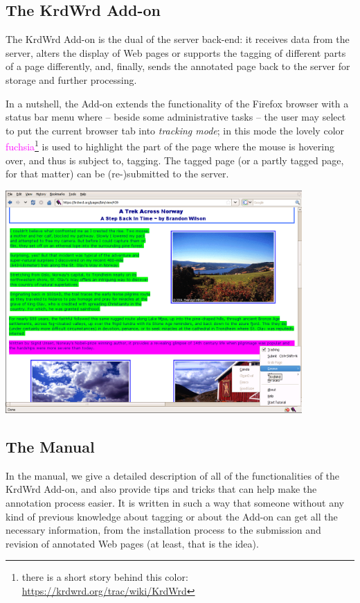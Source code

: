 \documentclass[12pt,a4paper]{article}
\begin{document}
\subsection{The KrdWrd Add-on\footnotemark}

The KrdWrd Add-on is the dual of the server back-end: 
it receives data from the server, alters the display of Web pages or supports the tagging of different parts of a page differently, and, finally, sends the annotated page back to the server for storage and further processing.

In a nutshell, the Add-on extends the functionality of the Firefox browser with a status bar menu where -- beside some administrative tasks -- the user may select to put the current browser tab into \textit{tracking mode}; 
in this mode the lovely color \textcolor{fuchsia}{fuchsia}\footnote{there is a short story behind this color: \url{https://krdwrd.org/trac/wiki/KrdWrd}}  is used to highlight the part of the page where the mouse is hovering over, and thus is subject to, tagging. 
The tagged page (or a partly tagged page, for that matter) can be (re-)submitted to the server.

\begin{center}
\includegraphics[width=0.85\textwidth]{images/taggingaction.png}  
\end{center}

\addtocounter{footnote}{1}
\subsection{The Manual\footnotemark[\value{footnote}]}

In the manual, we give a detailed description of all of the functionalities of the KrdWrd Add-on, and also provide tips and tricks that can help make the annotation process easier. 
It is written in such a way that someone without any kind of previous knowledge about tagging or about the Add-on can get all the necessary information, from the installation process to the submission and revision of annotated Web pages (at least, that is the idea).
\end{document}
